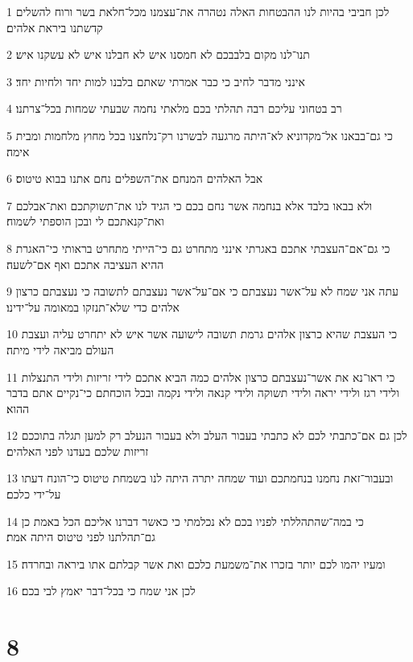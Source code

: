 \par 1 לכן חביבי בהיות לנו ההבטחות האלה נטהרה את־עצמנו מכל־חלאת בשר ורוח להשלים קדשתנו ביראת אלהים׃
\par 2 תנו־לנו מקום בלבבכם לא חמסנו איש לא חבלנו איש לא עשקנו איש׃
\par 3 אינני מדבר לחיב כי כבר אמרתי שאתם בלבנו למות יחד ולחיות יחד׃
\par 4 רב בטחוני עליכם רבה תהלתי בכם מלאתי נחמה שבעתי שמחות בכל־צרתנו׃
\par 5 כי גם־בבאנו אל־מקדוניא לא־היתה מרגעה לבשרנו רק־נלחצנו בכל מחוץ מלחמות ומבית אימה׃
\par 6 אבל האלהים המנחם את־השפלים נחם אתנו בבוא טיטוס׃
\par 7 ולא בבאו בלבד אלא בנחמה אשר נחם בכם כי הגיד לנו את־תשוקתכם ואת־אבלכם ואת־קנאתכם לי ובכן הוספתי לשמוח׃
\par 8 כי גם־אם־העצבתי אתכם באגרתי אינני מתחרט גם כי־הייתי מתחרט בראותי כי־האגרת ההיא העציבה אתכם ואף אם־לשעה׃
\par 9 עתה אני שמח לא על־אשר נעצבתם כי אם־על־אשר נעצבתם לתשובה כי נעצבתם כרצון אלהים כדי שלא־תנזקו במאומה על־ידינו׃
\par 10 כי העצבת שהיא כרצון אלהים גרמת תשובה לישועה אשר איש לא יתחרט עליה ועצבת העולם מביאה לידי מיתה׃
\par 11 כי ראו־נא את אשר־נעצבתם כרצון אלהים כמה הביא אתכם לידי זריזות ולידי התנצלות ולידי רגז ולידי יראה ולידי תשוקה ולידי קנאה ולידי נקמה ובכל הוכחתם כי־נקיים אתם בדבר ההוא׃
\par 12 לכן גם אם־כתבתי לכם לא כתבתי בעבור העלב ולא בעבור הנעלב רק למען תגלה בתוככם זריזות שלכם בעדנו לפני האלהים׃
\par 13 ובעבור־זאת נחמנו בנחמתכם ועוד שמחה יתרה היתה לנו בשמחת טיטוס כי־הונח דעתו על־ידי כלכם׃
\par 14 כי במה־שהתהללתי לפניו בכם לא נכלמתי כי כאשר דברנו אליכם הכל באמת כן גם־תהלתנו לפני טיטוס היתה אמת׃
\par 15 ומעיו יהמו לכם יותר בזכרו את־משמעת כלכם ואת אשר קבלתם אתו ביראה ובחרדה׃
\par 16 לכן אני שמח כי בכל־דבר יאמץ לבי בכם׃

\chapter{8}

